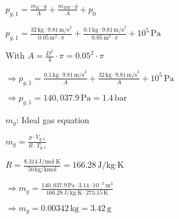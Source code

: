 \( p_{g,1} = \frac{m_{K} \cdot g}{A} + \frac{m_{EW} \cdot g}{A} + p_{0} \)  

\( p_{g,1} = \frac{32 \, \text{kg} \cdot 9.81 \, \text{m/s}^2}{0.05 \, \text{m}^2 \cdot \pi} + \frac{0.1 \, \text{kg} \cdot 9.81 \, \text{m/s}^2}{0.05 \, \text{m}^2 \cdot \pi} + 10^5 \, \text{Pa} \)  

With \( A = \frac{D^2}{4} \cdot \pi = 0.05^2 \cdot \pi \)  

\( \Rightarrow p_{g,1} = \frac{0.1 \, \text{kg} \cdot 9.81 \, \text{m/s}^2}{A} + \frac{32 \, \text{kg} \cdot 9.81 \, \text{m/s}^2}{A} + 10^5 \, \text{Pa} \)  

\( \Rightarrow p_{g,1} = 140,037.9 \, \text{Pa} = 1.4 \, \text{bar} \)  

\( m_{g} \): Ideal gas equation  

\( m_{g} = \frac{p \cdot V_{g,1}}{R \cdot T_{g,1}} \)  

\( R = \frac{8.314 \, \text{J/mol·K}}{50 \, \text{kg/kmol}} = 166.28 \, \text{J/kg·K} \)  

\( \Rightarrow m_{g} = \frac{140,037.9 \, \text{Pa} \cdot 3.14 \cdot 10^{-3} \, \text{m}^3}{166.28 \, \text{J/kg·K} \cdot 273.15 \, \text{K}} \)  

\( \Rightarrow m_{g} = 0.00342 \, \text{kg} = 3.42 \, \text{g} \)